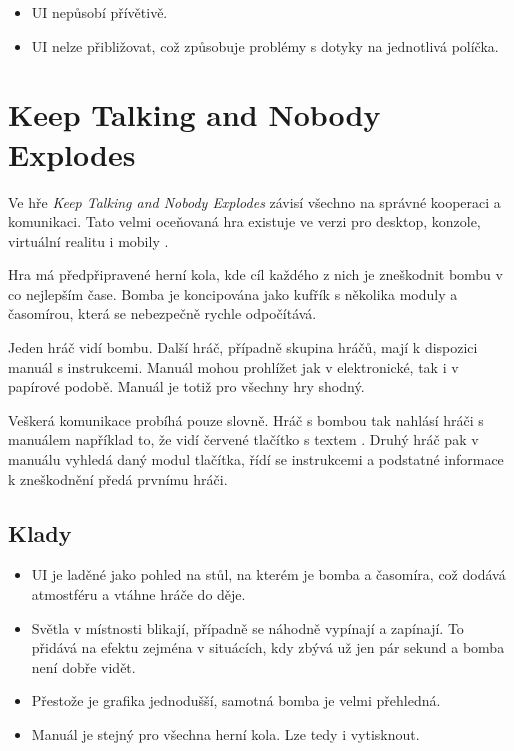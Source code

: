 \begin{itemize}
    \item UI nepůsobí přívětivě.
    \item UI nelze přibližovat,
což způsobuje problémy s dotyky na jednotlivá políčka.
\end{itemize}

\section{Keep Talking and Nobody Explodes}

Ve hře \emph{Keep Talking and Nobody Explodes} závisí všechno na správné
kooperaci a komunikaci.
Tato velmi oceňovaná hra existuje ve verzi pro desktop, konzole,
virtuální realitu i mobily \cite{steelcrategamesinc_keep}.

Hra má předpřipravené herní kola,
kde cíl každého z nich je zneškodnit bombu v co nejlepším čase.
Bomba je koncipována jako kufřík s několika moduly a časomírou,
která se nebezpečně rychle odpočítává.

Jeden hráč vidí bombu.
Další hráč, případně skupina hráčů, mají k dispozici manuál s instrukcemi.
Manuál mohou prohlížet jak v elektronické, tak i v papírové podobě.
Manuál je totiž pro všechny hry shodný.

Veškerá komunikace probíhá pouze slovně.
Hráč s bombou tak nahlásí hráči s manuálem například to,
že vidí červené tlačítko s textem .
Druhý hráč pak v manuálu vyhledá daný modul tlačítka, řídí se instrukcemi a
podstatné informace k zneškodnění předá prvnímu hráči.

\FloatBarrier

\subsection*{Klady}

\begin{itemize}
    \item UI je laděné jako pohled na stůl, na kterém je bomba a časomíra,
což dodává atmostféru a vtáhne hráče do děje.
    \item Světla v místnosti blikají, případně se náhodně vypínají a zapínají.
To přidává na efektu zejména v situácích,
kdy zbývá už jen pár sekund a bomba není dobře vidět.
    \item Přestože je grafika jednodušší, samotná bomba je velmi přehledná.
    \item Manuál je stejný pro všechna herní kola. Lze tedy i vytisknout.
\end{itemize}

